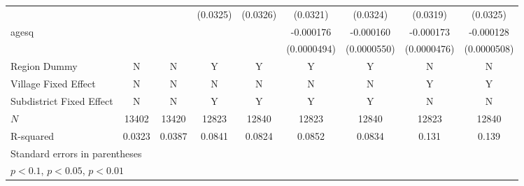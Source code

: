 {\begin{tabular}{l*{8}{c}}
            &                     &                     &    (0.0325)         &    (0.0326)         &    (0.0321)         &    (0.0324)         &    (0.0319)         &    (0.0325)         \\
\addlinespace
agesq       &                     &                     &                     &                     &   -0.000176\sym{***}&   -0.000160\sym{***}&   -0.000173\sym{***}&   -0.000128\sym{**} \\
            &                     &                     &                     &                     & (0.0000494)         & (0.0000550)         & (0.0000476)         & (0.0000508)         \\
Region Dummy & N & N & Y & Y & Y & Y & N & N \\
Village Fixed Effect & N & N & N & N & N & N & Y & Y \\
Subdistrict Fixed Effect & N & N & Y & Y & Y & Y & N & N \\\midrule
\(N\)       &       13402         &       13420         &       12823         &       12840         &       12823         &       12840         &       12823         &       12840         \\
R-squared   &      0.0323         &      0.0387         &      0.0841         &      0.0824         &      0.0852         &      0.0834         &       0.131         &       0.139         \\
\bottomrule
\multicolumn{9}{l}{\footnotesize Standard errors in parentheses}\\
\multicolumn{9}{l}{\footnotesize \sym{*} \(p<0.1\), \sym{**} \(p<0.05\), \sym{***} \(p<0.01\)}\\
\end{tabular}
}
